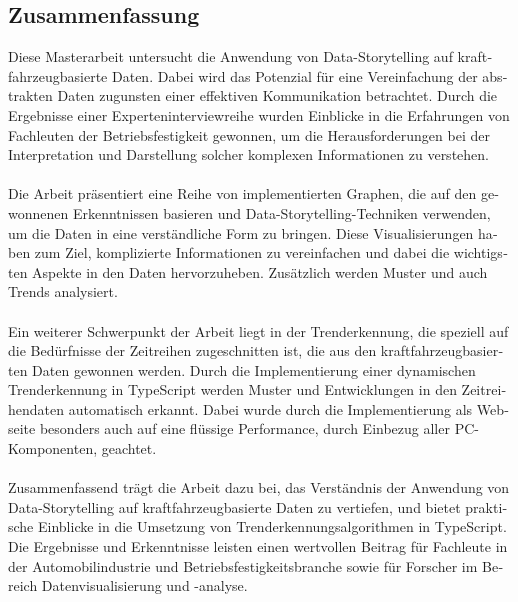 \begin{otherlanguage}{ngerman}
	\chapter*{Zusammenfassung}
Diese Masterarbeit untersucht die Anwendung von Data-Storytelling auf kraftfahrzeugbasierte Daten. Dabei wird das Potenzial für eine Vereinfachung der abstrakten Daten zugunsten einer effektiven Kommunikation betrachtet. Durch die Ergebnisse einer Experteninterviewreihe wurden Einblicke in die Erfahrungen von Fachleuten der Betriebsfestigkeit gewonnen, um die Herausforderungen bei der Interpretation und Darstellung solcher komplexen Informationen zu verstehen.\\\\
Die Arbeit präsentiert eine Reihe von implementierten Graphen, die auf den gewonnenen Erkenntnissen basieren und Data-Storytelling-Techniken verwenden, um die Daten in eine verständliche Form zu bringen. Diese Visualisierungen haben zum Ziel, komplizierte Informationen zu vereinfachen und dabei die wichtigsten Aspekte in den Daten hervorzuheben. Zusätzlich werden Muster und auch Trends analysiert.\\\\
Ein weiterer Schwerpunkt der Arbeit liegt in der Trenderkennung, die speziell auf die Bedürfnisse der Zeitreihen zugeschnitten ist, die aus den kraftfahrzeugbasierten Daten gewonnen werden. Durch die Implementierung einer dynamischen Trenderkennung in TypeScript werden Muster und Entwicklungen in den Zeitreihendaten automatisch erkannt. Dabei wurde durch die Implementierung als Webseite besonders auch auf eine flüssige Performance, durch Einbezug aller \ac{PC}-Komponenten, geachtet. \\\\
Zusammenfassend trägt die Arbeit dazu bei, das Verständnis der Anwendung von Data-Storytelling auf kraftfahrzeugbasierte Daten zu vertiefen, und bietet praktische Einblicke in die Umsetzung von Trenderkennungsalgorithmen in TypeScript. Die Ergebnisse und Erkenntnisse leisten einen wertvollen Beitrag für Fachleute in der Automobilindustrie und Betriebsfestigkeitsbranche sowie für Forscher im Bereich Datenvisualisierung und -analyse.
\end{otherlanguage}
